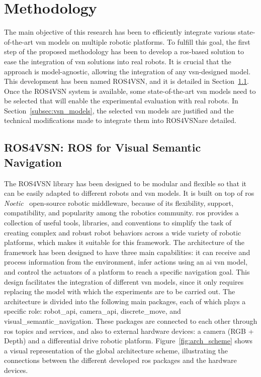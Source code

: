 \section{Methodology}\label{sec:methodology}
The main objective of this research has been to efficiently integrate various state-of-the-art \acrshort{vsn} models on multiple robotic platforms.
To fulfill this goal, the first step of the proposed methodology has been to develop a \acrshort{ros}-based solution to ease the integration of \acrshort{vsn} solutions into real robots.
It is crucial that the approach is model-agnostic, allowing the integration of any \acrshort{vsn}-designed model.
This development has been named ROS4VSN, and it is detailed in Section~\ref{subsec:ros4vsn}.
Once the ROS4VSN system is available, some state-of-the-art \acrshort{vsn} models need to be selected that will enable the experimental evaluation with real robots.
In Section~\ref{subsec:vsn_models}, the selected \acrshort{vsn} models are justified and the technical modifications made to integrate them into ROS4VSNare detailed.

\subsection{ROS4VSN: ROS for Visual Semantic Navigation}
\label{subsec:ros4vsn}

The ROS4VSN library has been designed to be modular and flexible so that it can be easily adapted to different robots and \acrshort{vsn} models.
It is built on top of \acrshort{ros} \textit{Noetic}~\cite{ros} open-source robotic middleware, because of its flexibility, support, compatibility, and popularity among the robotics community.
\acrshort{ros} provides a collection of useful tools, libraries, and conventions to simplify the task of creating complex and robust robot behaviors across a wide variety of robotic platforms, which makes it suitable for this framework.
The architecture of the framework has been designed to have three main capabilities: it can receive and process information from the environment, infer actions using an \acrshort{ai} \acrshort{vsn} model, and control the actuators of a platform to reach a specific navigation goal.
This design facilitates the integration of different \acrshort{vsn} models, since it only requires replacing the model with which the experiments are to be carried out.
The architecture is divided into the following main packages, each of which plays a specific role: robot\_api, camera\_api, discrete\_move, and visual\_semantic\_navigation.
These packages are connected to each other through \acrshort{ros} topics and services, and also to external hardware devices: a camera (RGB + Depth) and a differential drive robotic platform.
Figure~\ref{fig:arch_scheme} shows a visual representation of the global architecture scheme, illustrating the connections between the different developed \acrshort{ros} packages and the hardware devices.

